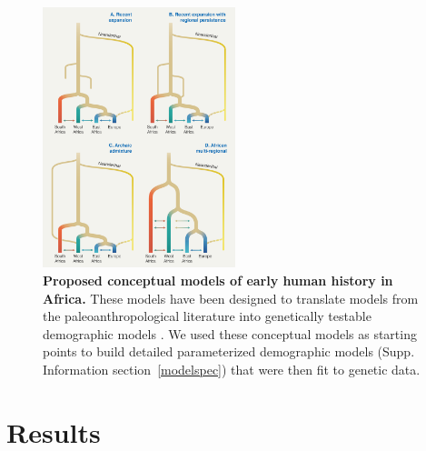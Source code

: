 \documentclass[]{article}
\begin{document}
\begin{figure}[ht]
    \centering
    \includegraphics[width=0.5\textwidth]{figures/proposed-models.png}
    \caption{
        \textbf{Proposed conceptual models of early human history in Africa.}
        These models have been designed to translate models from the 
        paleoanthropological literature into genetically testable demographic
        models \citep{Henn2018-rf}.
        We used these conceptual models as starting points to build detailed
        parameterized demographic models (Supp. Information section~\ref{modelspec})
        that were then fit to genetic data. 
    }
    \label{fig:proposed-models}
\end{figure}


\section*{Results}
\end{document}
